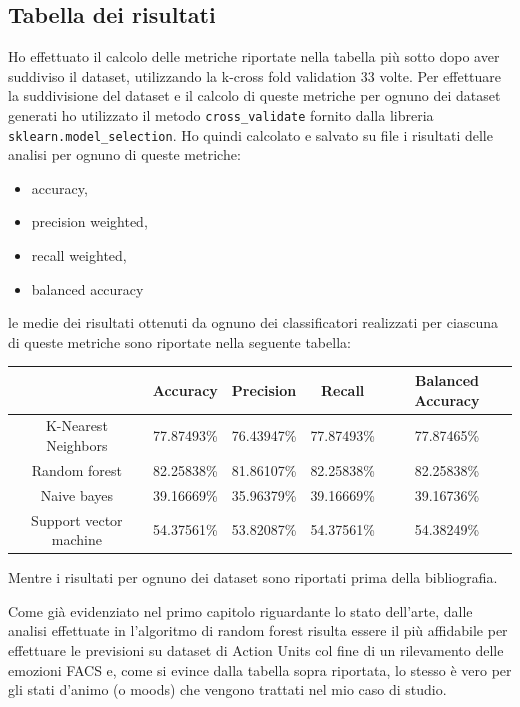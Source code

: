 \subsection{Tabella dei risultati}
Ho effettuato il calcolo delle metriche riportate nella tabella più sotto dopo aver suddiviso il dataset, utilizzando la k-cross fold validation 33 volte.
Per effettuare la suddivisione del dataset e il calcolo di queste metriche per ognuno dei dataset generati ho utilizzato il metodo \texttt{cross_validate} fornito dalla libreria \texttt{sklearn.model_selection}.
Ho quindi calcolato e salvato su file i risultati delle analisi per ognuno di queste metriche:
\begin{itemize}
    \item accuracy,
    \item precision weighted,
    \item recall weighted, 
    \item balanced accuracy
\end{itemize}
le medie dei risultati ottenuti da ognuno dei classificatori realizzati per ciascuna di queste metriche sono riportate nella seguente tabella:
\begin{center}
    \small %
    \begin{tabular}{ |c||c|c|c|c| } 
         \hline
          & Accuracy & Precision & Recall & Balanced Accuracy\\ 
         \hline\hline
         K-Nearest Neighbors& 77.87493\% & 76.43947\% & 77.87493\% & 77.87465\%\\
         \hline
         Random forest & 82.25838\% & 81.86107\% & 82.25838\% & 82.25838\%\\
         \hline
         Naive bayes& 39.16669\% & 35.96379\% & 39.16669\% & 39.16736\%\\
         \hline
         Support vector machine& 54.37561\% & 53.82087\% & 54.37561\% & 54.38249\%\\
         \hline
    \end{tabular}
\end{center}

Mentre i risultati per ognuno dei dataset sono riportati prima della bibliografia.

Come già evidenziato nel primo capitolo riguardante lo stato dell’arte, dalle analisi effettuate in \cite{FaceExpreRecoImgSeqTwoFoldRandomForestClass} l’algoritmo di random forest risulta essere il più affidabile per effettuare le previsioni su dataset di Action Units col fine di un rilevamento delle emozioni FACS e, come si evince dalla tabella sopra riportata, lo stesso è vero per gli stati d’animo (o moods) che vengono trattati nel mio caso di studio.